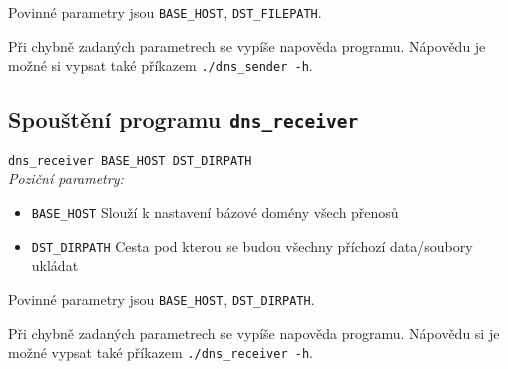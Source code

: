 Povinné parametry jsou \texttt{BASE\_HOST}, \texttt{DST\_FILEPATH}.

Při chybně zadaných parametrech se vypíše napověda programu. Nápovědu
je možné si vypsat také příkazem \texttt{./dns\_sender -h}.

\subsection{Spouštění programu \texttt{dns\_receiver}}

\texttt{dns\_receiver {BASE\_HOST} {DST\_DIRPATH}} \\

\textit{Poziční parametry:}

\begin{itemize}
    \item \texttt{BASE\_HOST} Slouží k nastavení bázové domény všech přenosů
    \item \texttt{DST\_DIRPATH} Cesta pod kterou se budou všechny příchozí data/soubory ukládat
\end{itemize}

Povinné parametry jsou \texttt{BASE\_HOST}, \texttt{DST\_DIRPATH}.

Při chybně zadaných parametrech se vypíše napověda programu. Nápovědu
si je možné vypsat také příkazem \texttt{./dns\_receiver -h}.
